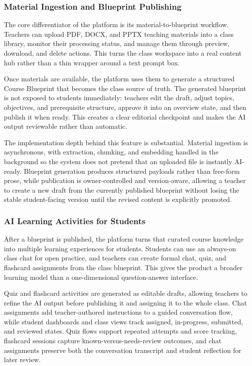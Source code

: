 \documentclass[11pt,a4paper]{article}
\begin{document}
\subsubsection*{Material Ingestion and Blueprint Publishing}

The core differentiator of the platform is its material-to-blueprint workflow. Teachers can upload
PDF, DOCX, and PPTX teaching materials into a class library, monitor their processing status, and
manage them through preview, download, and delete actions. This turns the class workspace into a
real content hub rather than a thin wrapper around a text prompt box.

Once materials are available, the platform uses them to generate a structured Course Blueprint that
becomes the class source of truth. The generated blueprint is not exposed to students immediately:
teachers edit the draft, adjust topics, objectives, and prerequisite structure, approve it into an
overview state, and then publish it when ready. This creates a clear editorial checkpoint and makes
the AI output reviewable rather than automatic.

The implementation depth behind this feature is substantial. Material ingestion is asynchronous,
with extraction, chunking, and embedding handled in the background so the system does not pretend
that an uploaded file is instantly AI-ready. Blueprint generation produces structured payloads
rather than free-form prose, while publication is owner-controlled and version-aware, allowing a
teacher to create a new draft from the currently published blueprint without losing the stable
student-facing version until the revised content is explicitly promoted.

\subsubsection*{AI Learning Activities for Students}

After a blueprint is published, the platform turns that curated course knowledge into multiple
learning experiences for students. Students can use an always-on class chat for open practice, and
teachers can create formal chat, quiz, and flashcard assignments from the class blueprint. This
gives the product a broader learning model than a one-dimensional question-answer interface.

Quiz and flashcard activities are generated as editable drafts, allowing teachers to refine the AI
output before publishing it and assigning it to the whole class. Chat assignments add
teacher-authored instructions to a guided conversation flow, while student dashboards and class
views track assigned, in-progress, submitted, and reviewed states. Quiz flows support repeated
attempts and score tracking, flashcard sessions capture known-versus-needs-review outcomes, and
chat assignments preserve both the conversation transcript and student reflection for later review.
\end{document}
